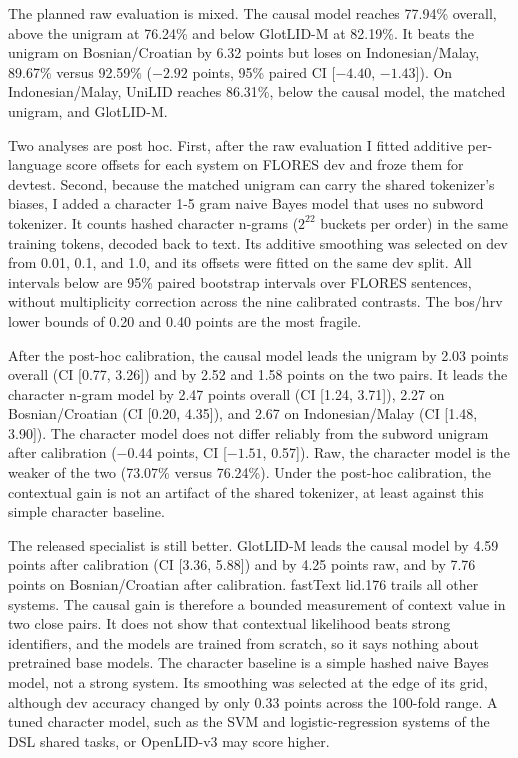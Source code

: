 \documentclass[11pt]{article}
\begin{document}
The planned raw evaluation is mixed. The causal model reaches 77.94\% overall,
above the unigram at 76.24\% and below GlotLID-M at 82.19\%. It beats the
unigram on Bosnian/Croatian by 6.32 points but loses on Indonesian/Malay,
89.67\% versus 92.59\% ($-2.92$ points, 95\% paired CI [$-4.40$, $-1.43$]).
On Indonesian/Malay, UniLID reaches 86.31\%, below the causal model, the
matched unigram, and GlotLID-M.

Two analyses are post hoc. First, after the raw evaluation I fitted additive
per-language score offsets for each system on FLORES dev and froze them for
devtest. Second, because the matched unigram can carry the shared tokenizer's
biases, I added a character 1-5 gram naive Bayes model that uses no subword
tokenizer. It counts hashed character n-grams ($2^{22}$ buckets per order) in
the same training tokens, decoded back to text. Its additive smoothing was
selected on dev from 0.01, 0.1, and 1.0, and its offsets were fitted on the
same dev split. All intervals below are 95\% paired bootstrap intervals over
FLORES sentences, without multiplicity correction across the nine calibrated
contrasts. The bos/hrv lower bounds of 0.20 and 0.40 points are the most
fragile.

After the post-hoc calibration, the causal model leads the unigram by 2.03
points overall (CI [0.77, 3.26]) and by 2.52 and 1.58 points on the two pairs.
It leads the character n-gram model by 2.47 points overall (CI [1.24, 3.71]),
2.27 on Bosnian/Croatian (CI [0.20, 4.35]), and 2.67 on Indonesian/Malay (CI
[1.48, 3.90]). The character model does not differ reliably from the subword
unigram after calibration ($-0.44$ points, CI [$-1.51$, 0.57]). Raw, the
character model is the weaker of the two (73.07\% versus 76.24\%). Under the
post-hoc calibration, the contextual gain is not an artifact of the shared
tokenizer, at least against this simple character baseline.

The released specialist is still better. GlotLID-M leads the causal model by
4.59 points after calibration (CI [3.36, 5.88]) and by 4.25 points raw, and by
7.76 points on Bosnian/Croatian after calibration. fastText lid.176 trails all
other systems. The causal gain is therefore a bounded measurement of context
value in two close pairs. It does not show that contextual likelihood beats
strong identifiers, and the models are trained from scratch, so it says
nothing about pretrained base models. The character baseline is a simple
hashed naive Bayes model, not a strong system. Its smoothing was selected at
the edge of its grid, although dev accuracy changed by only 0.33 points across
the 100-fold range. A tuned character model, such as the SVM and
logistic-regression systems of the DSL shared tasks, or OpenLID-v3 may score
higher.
\end{document}
